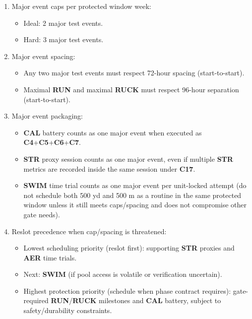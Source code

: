 \documentclass[10pt]{article}
\begin{document}
\begin{enumerate}
\item Major event caps per protected window week:
  \begin{itemize}
  \item Ideal: 2 major test events.
  \item Hard: 3 major test events.
  \end{itemize}

\item Major event spacing:
  \begin{itemize}
  \item Any two major test events must respect 72-hour spacing (start-to-start).
  \item Maximal \textbf{RUN} and maximal \textbf{RUCK} must respect 96-hour separation (start-to-start).
  \end{itemize}

\item Major event packaging:
  \begin{itemize}
  \item \textbf{CAL} battery counts as one major event when executed as \textbf{C4}+\textbf{C5}+\textbf{C6}+\textbf{C7}.
  \item \textbf{STR} proxy session counts as one major event, even if multiple \textbf{STR} metrics are recorded inside the same session under \textbf{C17}.
  \item \textbf{SWIM} time trial counts as one major event per unit-locked attempt (do not schedule both 500 yd and 500 m as a routine in the same protected window unless it still meets caps/spacing and does not compromise other gate needs).
  \end{itemize}

\item Reslot precedence when cap/spacing is threatened:
  \begin{itemize}
  \item Lowest scheduling priority (reslot first): supporting \textbf{STR} proxies and \textbf{AER} time trials.
  \item Next: \textbf{SWIM} (if pool access is volatile or verification uncertain).
  \item Highest protection priority (schedule when phase contract requires): gate-required \textbf{RUN}/\textbf{RUCK} milestones and \textbf{CAL} battery, subject to safety/durability constraints.
  \end{itemize}
\end{enumerate}
\end{document}
